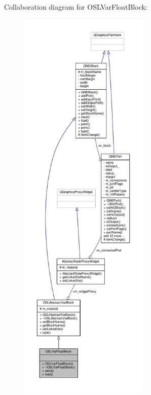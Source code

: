 Collaboration diagram for O\-S\-L\-Var\-Float\-Block\-:
\nopagebreak
\begin{figure}[H]
\begin{center}
\leavevmode
\includegraphics[height=550pt]{class_o_s_l_var_float_block__coll__graph}
\end{center}
\end{figure}
